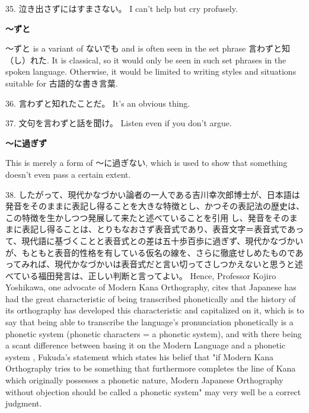 \par{35. 泣き出さずにはすまさない。 \hfill\break
I can't help but cry profusely. }

\par{ \textbf{～ずと }}

\par{ ～ずと is a variant of ないでも and is often seen in the set phrase 言わずと知（し）れた. It is classical, so it would only be seen in such set phrases in the spoken language. Otherwise, it would be limited to writing styles and situations suitable for 古語的な書き言葉. }

\par{36. 言わずと知れたことだ。 \hfill\break
It's an obvious thing. }

\par{37. 文句を言わずと話を聞け。 \hfill\break
Listen even if you don't argue. }

\begin{center}
 \textbf{～に過ぎず }
\end{center}

\par{ This is merely a form of ～に過ぎない, which is used to show that something doesn't even pass a certain extent. }
\hfill\break

\par{38. したがって、現代かなづかい論者の一人である吉川幸次郎博士が、日本語は発音をそのままに表記し得ることを大きな特徴とし、かつその表記法の歴史は、この特徴を生かしつつ発展して来たと述べていることを引用 し、発音をそのままに表記し得ることは、とりもなおさず表音式であり、表音文字＝表音式であって、現代語に基づくことと表音式との差は五十歩百歩に過ぎず、現代かなづかいが、もともと表音的性格を有している仮名の線を、さらに徹底せしめたものであってみれば、現代かなづかいは表音式だと言い切ってさしつかえないと思うと述べている福田発言は、正しい判断と言ってよい。 \hfill\break
Hence, Professor Kojiro Yoshikawa, one advocate of Modern Kana Orthography, cites that Japanese has had the great characteristic of being transcribed phonetically and the history of its orthography has developed this characteristic and capitalized on it, which is to say that being able to transcribe the language's pronunciation phonetically is a phonetic system (phonetic characters = a phonetic system), and with there being a scant difference between basing it on the Modern Language and a phonetic system , Fukuda's statement which states his belief that "if Modern Kana Orthography tries to be something that furthermore completes the line of Kana which originally possesses a phonetic nature, Modern Japanese Orthography without objection should be called a phonetic system" may very well be a correct judgment. }

